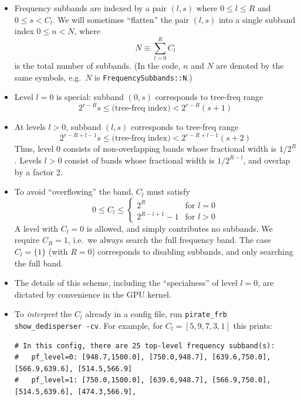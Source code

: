 \documentclass{article}
\numberwithin{equation}{section}   %
\begin{document}
\begin{itemize}
\item Frequency subbands are indexed by a pair $(l,s)$ where $0 \le l \le R$ and $0 \le s < C_l$.
We will sometimes ``flatten'' the pair $(l,s)$ into a single subband index $0 \le n < N$, where
\begin{equation}
N \equiv \sum_{l=0}^R C_l
\end{equation}
is the total number of subbands. 
(In the code, $n$ and $N$ are denoted by the same symbols, e.g.\ $N$ is {\tt FrequencySubbands::N}.)
\item Level $l=0$ is special: subband $(0,s)$ corresponds to tree-freq range
\begin{equation}
2^{r-R} s \le \mbox{(tree-freq index)} < 2^{r-R} (s+1)  \label{eq:subband_l0}
\end{equation}
\item At levels $l>0$, subband $(l,s)$ corresponds to tree-freq range
\begin{equation}
2^{r-R+l-1} s \le \mbox{(tree-freq index)} < 2^{r-R+l-1} (s+2)  \label{eq:subband_l1}
\end{equation}
Thus, level 0 consists of non-overlapping bands whose fractional width is $1/2^R$.
Levels $l>0$ consist of bands whose fractional width is $1/2^{R-l}$, and overlap by a factor 2.
\item
To avoid ``overflowing'' the band, $C_l$ must satisfy
\begin{equation}
0 \le C_l \le \begin{cases}
2^R & \mbox{for } l=0 \\
2^{R-l+1}-1 & \mbox{for } l>0
\end{cases}
\end{equation}
A level with $C_l=0$ is allowed, and simply contributes no subbands.
We require $C_R=1$, i.e.~we always search the full frequency band.
The case $C_l=\{1\}$ (with $R=0$) corresponds to disabling subbands, and only searching the full band.
\item The details of this scheme, including the ``specialness'' of level $l=0$, are
dictated by convenience in the GPU kernel.
\item To {\em interpret} the $C_l$ already in a config file, run \verb|pirate_frb show_dedisperser -cv|.
For example, for $C_l=[5,9,7,3,1]$ this prints:
\begin{verbatim}
# In this config, there are 25 top-level frequency subband(s):
#   pf_level=0: [948.7,1500.0], [750.0,948.7], [639.6,750.0], [566.9,639.6], [514.5,566.9]
#   pf_level=1: [750.0,1500.0], [639.6,948.7], [566.9,750.0], [514.5,639.6], [474.3,566.9],

\end{verbatim}
\end{itemize}
\end{document}
